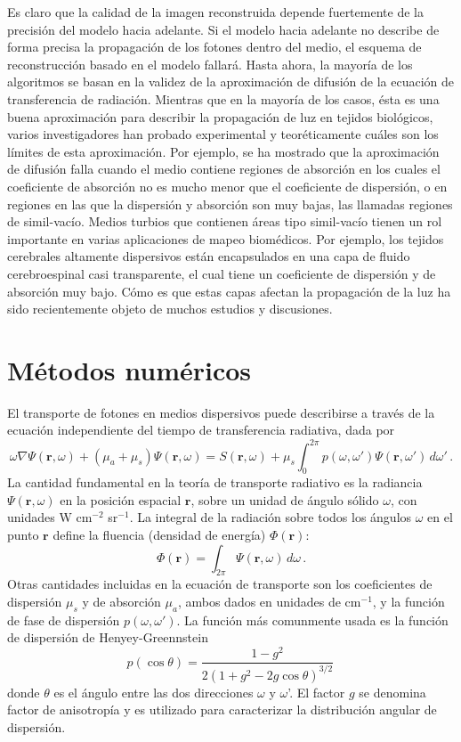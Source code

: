 \documentclass[a4paper,10pt]{article}
\begin{document}
Es claro que la calidad de la imagen reconstruida depende fuertemente de 
la precisión del modelo hacia adelante. Si el modelo hacia adelante no 
describe de forma precisa la propagación de los fotones dentro del 
medio, el esquema de reconstrucción basado en el modelo fallará. Hasta
ahora, la mayoría de los algoritmos se basan en la validez de la
aproximación de difusión de la ecuación de transferencia de radiación.
Mientras que en la mayoría de los casos, ésta es una buena aproximación
para describir la propagación de luz en tejidos biológicos, varios
investigadores han probado experimental y teoréticamente cuáles son los
límites de esta aproximación. Por ejemplo, se ha mostrado que la
aproximación de difusión falla cuando el medio contiene regiones de
absorción en los cuales el coeficiente de absorción no es mucho menor 
que el coeficiente de dispersión, o en regiones en las que la dispersión 
y absorción son muy bajas, las llamadas regiones de simil-vacío. 
Medios turbios que contienen áreas tipo simil-vacío tienen un rol
importante en varias aplicaciones de mapeo biomédicos. Por ejemplo, los
tejidos cerebrales altamente dispersivos están encapsulados en una capa 
de fluido cerebroespinal casi transparente, el cual tiene un coeficiente
de dispersión y de absorción muy bajo. Cómo es que estas capas afectan 
la propagación de la luz ha sido recientemente objeto de muchos estudios 
y discusiones. 

\section{Métodos numéricos}

El transporte de fotones en medios dispersivos puede describirse a 
través de la ecuación independiente del tiempo de transferencia 
radiativa, dada por
\begin{equation}
 \omega\nabla\Psi(\mathbf{r},\omega)+(\mu_a+\mu_s)\Psi(\mathbf{r},\omega)
 =S(\mathbf{r},\omega) + 
 \mu_s\int_0^{2\pi}p(\omega,\omega')\Psi(\mathbf{r},\omega')\,d\omega'\,.
\end{equation}
La cantidad fundamental en la teoría de transporte radiativo es la
radiancia $\Psi(\mathbf{r},\omega)$ en la posición espacial 
$\mathbf{r}$, sobre un unidad de ángulo sólido $\omega$, con unidades 
W cm$^{-2}$ sr$^{-1}$. La integral de la radiación sobre todos los 
ángulos $\omega$ en el punto $\mathbf{r}$ define la fluencia (densidad de 
energía) $\Phi(\mathbf{r})$:
\begin{equation}
 \Phi(\mathbf{r})=\int_{2\pi}\Psi(\mathbf{r},\omega)\,d\omega\,.
\end{equation}
Otras cantidades incluidas en la ecuación de transporte son los 
coeficientes de dispersión $\mu_s$ y de absorción $\mu_a$, ambos dados 
en unidades de cm$^{-1}$, y la función de fase de dispersión 
$p(\omega,\omega')$. La función más comunmente usada es la función de dispersión de Henyey-Greennstein
\begin{equation}
 p(\cos\theta)=\frac{1-g^2}{2(1+g^2-2g\cos\theta)^{3/2}}\,
\end{equation}
donde $\theta$ es el ángulo entre las dos direcciones $\omega$ y 
$\omega$'. El factor $g$ se denomina factor de anisotropía y es utilizado 
para caracterizar la distribución angular de dispersión.
\end{document}

